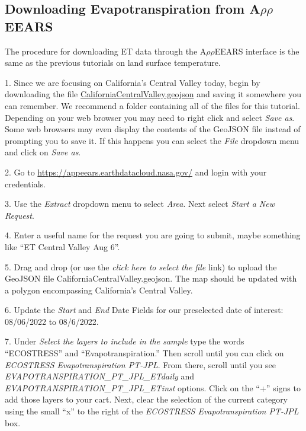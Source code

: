 \documentclass[oneside,a4paper,11pt,explicit]{book}
\begin{document}
\subsection{Downloading Evapotranspiration from A$\rho\rho$EEARS}

The procedure for downloading ET data through the A$\rho\rho$EEARS interface is the same as the previous tutorials on land surface temperature.

1. Since we are focusing on California's Central Valley today, begin by downloading the file \href{https://jeremydforsythe.github.io/icecream-tutorials/Tutorial6_Evaportranspiration1/CaliforniaCentralValley.geojson}{CaliforniaCentralValley.geojson} and saving it somewhere you can remember. We recommend a folder containing all of the files for this tutorial. Depending on your web browser you may need to right click and select \textit{Save as}. Some web browsers may even display the contents of the GeoJSON file instead of prompting you to save it. If this happens you can select the \textit{File} dropdown menu and click on \textit{Save as}. 


2. Go to \href{https://appeears.earthdatacloud.nasa.gov/}{https://appeears.earthdatacloud.nasa.gov/} and login with your credentials. 

3. Use the \textit{Extract} dropdown menu to select \textit{Area}. Next select \textit{Start a New Request}. 

4. Enter a useful name for the request you are going to submit, maybe something like ``ET Central Valley Aug 6''. 

5. Drag and drop (or use the \textit{click here to select the file} link) to upload the GeoJSON file CaliforniaCentralValley.geojson. The map should be updated with a polygon encompassing California's Central Valley.

6. Update the \textit{Start} and \textit{End} Date Fields for our preselected date of interest: 08/06/2022 to 08/6/2022.

7. Under \textit{Select the layers to include in the sample} type the words ``ECOSTRESS'' and ``Evapotranspiration.'' Then scroll until you can click on \textit{ECOSTRESS Evapotranspiration PT-JPL}. From there, scroll until you see \textit{EVAPOTRANSPIRATION\_PT\_JPL\_ETdaily} and \textit{EVAPOTRANSPIRATION\_PT\_JPL\_ETinst} options. Click on the ``+'' signs to add those layers to your cart. Next, clear the selection of the current category using the small ``x'' to the right of the \textit{ECOSTRESS Evapotranspiration PT-JPL} box.
\end{document}
